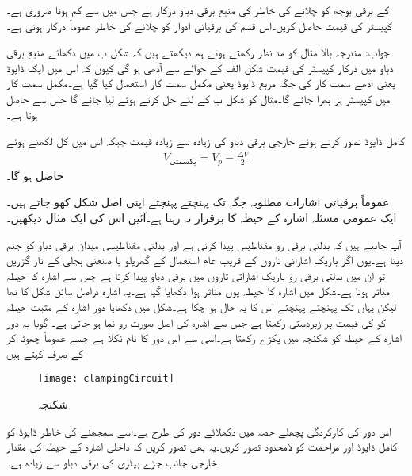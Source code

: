  کے برقی بوجھ کو چلانے کی خاطر  کی منبع برقی دباو درکار ہے جس میں   سے کم ہونا ضروری ہے۔کپیسٹر کی قیمت حاصل کریں۔اس قسم کی  برقیاتی ادوار کو چلانے کی خاطر عموماً درکار ہوتی ہے۔

جواب: 
مندرجہ بالا مثال کو مد نظر رکھتے ہوئے ہم دیکھتے ہیں کہ شکل  ب میں دکھائے منبع برقی دباو میں درکار کپیسٹر کی قیمت شکل  الف کے حوالے سے آدھی ہو گی کیوں کہ اس میں ایک ڈایوڈ یعنی آدھے سمت کار کی جگہ مربع ڈایوڈ یعنی مکمل سمت کار استعمال کیا گیا ہے۔مکمل سمت کار میں کپیسٹر ہر  بھرا جائے گا۔مثال  کو شکل  ب کے لئے حل کرتے ہوئے  لیا جائے گا جس سے  حاصل ہوتا ہے۔ 
 
کامل ڈایوڈ تصور کرتے ہوئے خارجی برقی دباو کی زیادہ سے زیادہ قیمت  جبکہ اس میں کل   لکھتے ہوئے
\begin{align}
V_{\textrm{یکسمتی}}=V_p-\frac{\Delta V}{2}
\end{align}
حاصل ہو گا۔

عموماً برقیاتی اشارات مطلوبہ جگہ تک پہنچتے پہنچتے اپنی اصل شکل کھو جاتے ہیں۔ ایک عمومی مسئلہ اشارہ کے حیطہ کا برقرار نہ رہنا ہے۔آئیں اس کی ایک مثال دیکھیں۔

آپ جانتے ہیں کہ بدلتی برقی رو مقناطیس پیدا کرتی ہے اور بدلتی مقناطیسی میدان برقی دباو کو جنم دیتا ہے۔یوں اگر باریک اشاراتی تاروں کے قریب عام استعمال کے گھریلو یا صنعتی بجلی کے تار گزریں تو ان میں بدلتی برقی رو باریک اشاراتی تاروں میں برقی دباو پیدا کرتا ہے جس سے اشارہ کا حیطہ متاثر ہوتا ہے۔شکل   میں اشارہ   کا حیطہ یوں متاثر ہوا دکھایا گیا ہے۔یہ اشارہ دراصل سائن شکل کا تھا لیکن یہاں تک پہنچتے پہنچتے اس کا یہ حال ہو چکا ہے۔شکل   میں دکھایا دور اشارہ کے مثبت حیطہ کو  کی قیمت پر زبردستی رکھتا ہے جس سے اشارہ کی اصل صورت رو نما ہو جاتی ہے۔ گویا یہ دور اشارہ کے حیطہ کو شکنجہ میں پکڑے رکھتا ہے۔اسی سے اس دور کا نام   نکلا ہے جسے عموماً چھوٹا  کر کے صرف  کہتے ہیں
\begin{figure}
\centering
\texttt{[image: clampingCircuit]}
\caption{شکنجہ}
\label{شکل_شکنجہ}
\end{figure}
اس دور کی کارکردگی پچھلے حصہ میں دکھلائے دور کی طرح ہے۔اسے سمجھنے کی خاطر ڈایوڈ   کو کامل ڈایوڈ اور مزاحمت  کو لامحدود تصور کریں۔یہ بھی تصور کریں کہ داخلی اشارہ  کے حیطہ  کی مقدار خارجی جانب جڑے بیٹری کی برقی دباو  سے زیادہ ہے۔


